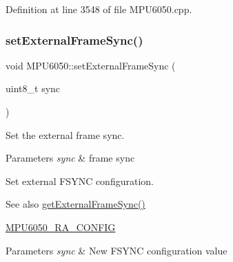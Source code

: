 Definition at line 3548 of file M\+P\+U6050.\+cpp.


\begin{DoxyCode}{0}

\end{DoxyCode}
\mbox{\label{classMPU6050_a77b36f41c531a11b5a835fc75a9aefe6}} 
\subsubsection{\texorpdfstring{setExternalFrameSync()}{setExternalFrameSync()}}
{\footnotesize\ttfamily void M\+P\+U6050\+::set\+External\+Frame\+Sync (\begin{DoxyParamCaption}\item[{uint8\+\_\+t}]{sync }\end{DoxyParamCaption})}

Set the external frame sync.


\begin{DoxyParams}{Parameters}
{\em sync} & frame sync\\
\hline
\end{DoxyParams}
Set external F\+S\+Y\+NC configuration. \begin{DoxySeeAlso}{See also}
\mbox{\hyperlink{classMPU6050_a902a7d486cd6ac21f8c378634dc6f59a}{get\+External\+Frame\+Sync()}} 

\mbox{\hyperlink{MPU6050_8h_a51c78b27e0368d91c94209dbeca4df90}{M\+P\+U6050\+\_\+\+R\+A\+\_\+\+C\+O\+N\+F\+IG}} 
\end{DoxySeeAlso}

\begin{DoxyParams}{Parameters}
{\em sync} & New F\+S\+Y\+NC configuration value \\
\hline
\end{DoxyParams}


